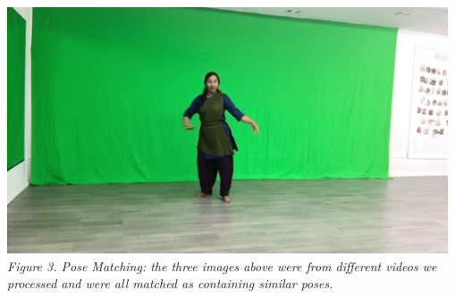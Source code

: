 \documentclass[10pt,twocolumn,letterpaper]{article}
\begin{document}
\includegraphics[width=\columnwidth]{sec/indian_dance_image}
\textit{Figure 3. Pose Matching: the three images above were from different videos we processed and were all matched as containing similar poses.}


\pagebreak
% 
% 
\nocite{*}
{
    \small
    
    
}

% 
\end{document}
